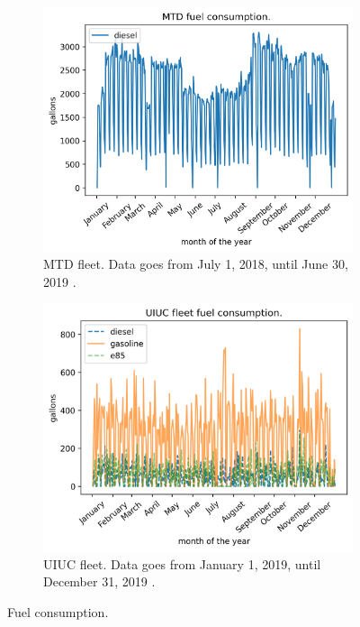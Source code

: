 \documentclass[11pt,letterpaper]{article}
\begin{document}
	\begin{figure}[htbp!]
		\centering
		\begin{subfigure}[t]{0.4\textwidth}
			\centering
			\includegraphics[width=\linewidth]{figures/mtd2}
			\caption{\gls{MTD} fleet. Data goes from July 1, 2018, until June 30, 2019 \cite{mtd_irecords_2019}.}
		\end{subfigure}
		\begin{subfigure}[t]{0.4\textwidth}
			\centering
			\includegraphics[width=\linewidth]{figures/uiuc}
			\caption{\gls{UIUC} fleet. Data goes from January 1, 2019, until December 31, 2019 \cite{uiuc_personnal_communication}.}
		\end{subfigure}
		\hfill
		\caption{Fuel consumption.}
		\label{fig:fuel}
	\end{figure}
\end{document}
